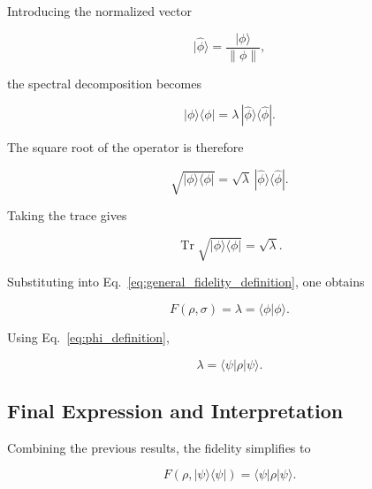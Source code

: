 Introducing the normalized vector

\begin{equation}
|\hat{\phi}\rangle
=
\frac{|\phi\rangle}{\|\phi\|},
\label{eq:normalized_phi}
\end{equation}

the spectral decomposition becomes

\begin{equation}
|\phi\rangle\langle\phi|
=
\lambda\,
|\hat{\phi}\rangle\langle\hat{\phi}|.
\label{eq:spectral_decomposition_rank_one}
\end{equation}

The square root of the operator is therefore

\begin{equation}
\sqrt{
|\phi\rangle\langle\phi|
}
=
\sqrt{\lambda}\,
|\hat{\phi}\rangle\langle\hat{\phi}|.
\label{eq:square_root_rank_one}
\end{equation}

Taking the trace gives

\begin{equation}
\operatorname{Tr}
\sqrt{
|\phi\rangle\langle\phi|
}
=
\sqrt{\lambda}.
\label{eq:trace_square_root_rank_one}
\end{equation}

Substituting into Eq.~\eqref{eq:general_fidelity_definition}, one obtains

\begin{equation}
F(\rho,\sigma)
=
\lambda
=
\langle \phi | \phi \rangle.
\label{eq:fidelity_lambda_relation}
\end{equation}

Using Eq.~\eqref{eq:phi_definition},

\begin{equation}
\lambda
=
\langle \psi |
\rho
|\psi\rangle.
\label{eq:lambda_final_expression}
\end{equation}


\subsection*{Final Expression and Interpretation}

Combining the previous results, the fidelity simplifies to

\begin{equation}
F(\rho,|\psi\rangle\langle\psi|)
=
\langle \psi |
\rho
|\psi\rangle.
\label{eq:fidelity_pure_reference_final}
\end{equation}

